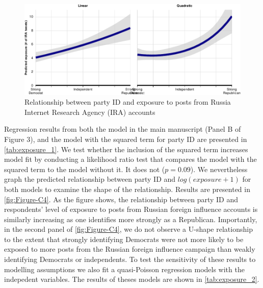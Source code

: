 \documentclass[
  12pt,
]{article}
\begin{document}
\begin{figure}
\centering
\includegraphics{Appendix_files/figure-latex/Figure-C4-1.pdf}
\caption{\label{fig:Figure-C4}Relationship between party ID and exposure to posts from Russia Internet Research Agency (IRA) accounts}
\end{figure}

Regression results from both the model in the main manuscript (Panel B of Figure 3), and the model with the squared term for party ID are presented in \autoref{tab:exposure_1}. We test whether the inclusion of the squared term increases model fit by conducting a likelihood ratio test that compares the model with the squared term to the model without it. It does not (\(p = 0.09\)). We nevertheless graph the predicted relationship between party ID and \(log(exposure + 1)\) for both models to examine the shape of the relationship. Results are presented in \autoref{fig:Figure-C4}. As the figure shows, the relationship between party ID and respondents' level of exposure to posts from Russian foreign influence accounts is similarly increasing as one identifies more strongly as a Republican. Importantly, in the second panel of \autoref{fig:Figure-C4}, we do not observe a U-shape relationship to the extent that strongly identifying Democrats were not more likely to be exposed to more posts from the Russian foreign influence campaign than weakly identifying Democrats or independents. To test the sensitivity of these results to modelling assumptions we also fit a quasi-Poisson regression models with the indepedent variables. The results of theses models are shown in \autoref{tab:exposure_2}.
\end{document}
